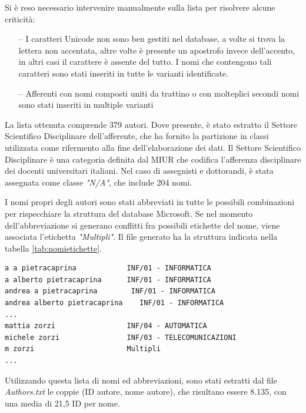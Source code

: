 \documentclass[12pt,a4paper,twoside]{report}
\begin{document}
Si è reso necessario intervenire manualmente sulla lista per risolvere alcune criticità:
\begin{itemize}
\item[--]
    I caratteri Unicode non sono ben gestiti nel database, a volte si trova la lettera non
        accentata, altre volte è presente un apostrofo invece dell'accento, in altri casi il
        carattere è assente del tutto. I nomi che contengono tali caratteri sono stati inseriti in
        tutte le varianti identificate.
\item[--]
    Afferenti con nomi composti uniti da trattino o con molteplici secondi nomi sono stati inseriti
        in multiple varianti
\end{itemize}

La lista ottenuta comprende 379 autori.
Dove presente, è stato estratto il Settore Scientifico Disciplinare dell'afferente, che ha fornito
la partizione in classi utilizzata come rifermento alla fine dell'elaborazione dei dati. Il Settore
Scientifico Disciplinare è una categoria definita dal MIUR che codifica l'afferenza disciplinare dei
docenti universitari italiani.
Nel caso di assegnisti e dottorandi, è stata assegnata come classe \textit{"N/A"}, che include 204
nomi.

I nomi propri degli autori sono stati abbreviati in tutte le possibili combinazioni per rispecchiare
la struttura del database Microsoft. Se nel momento dell'abbreviazione si generano conflitti fra
possibili etichette del nome, viene associata l'etichetta \textit{"Multipli"}. Il file generato ha
la struttura indicata nella tabella \ref{tab:nomietichette}.

\begin{center}
\label{tab:nomietichette}
\begin{minipage}{0.90\textwidth}
\begin{verbatim}
a a pietracaprina            INF/01 - INFORMATICA
a alberto pietracaprina	     INF/01 - INFORMATICA
andrea a pietracaprina	      INF/01 - INFORMATICA
andrea alberto pietracaprina	INF/01 - INFORMATICA
...
mattia zorzi                 INF/04 - AUTOMATICA
michele zorzi                INF/03 - TELECOMUNICAZIONI
m zorzi                      Multipli
...
\end{verbatim}
\end{minipage}
\end{center}

Utilizzando questa lista di nomi ed abbreviazioni, sono stati estratti dal file \textit{Authors.txt}
le coppie (ID autore, nome autore), che risultano essere 8.135, con una media di 21,5 ID per nome.
\end{document}
